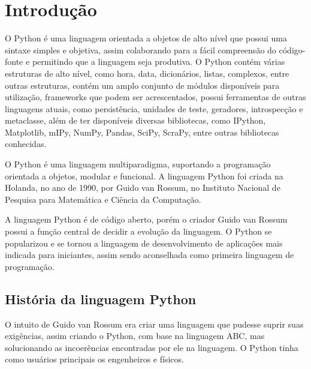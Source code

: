 


\chapter{ Introdução}

O Python é uma linguagem orientada a objetos de alto nível que possui uma sintaxe simples e objetiva, assim colaborando para a fácil compreensão do código-fonte e permitindo que a linguagem seja produtiva. O Python contém várias estruturas de alto nível, como hora, data, dicionários, listas, complexos, entre outras estruturas, contém um amplo conjunto de módulos disponíveis para utilização, frameworks que podem ser acrescentados, possui ferramentas de outras linguagens atuais, como persistência, unidades de teste, geradores, introspecção e metaclasse, além de ter disponíveis diversas bibliotecas, como IPython, Matplotlib, mIPy, NumPy, Pandas, SciPy, ScraPy, entre outras bibliotecas conhecidas.

O Python é uma linguagem multiparadigma, suportando a programação orientada a objetos, modular e funcional. A linguagem Python foi criada na Holanda, no ano de 1990, por Guido van Rossum, no Instituto Nacional de Pesquisa para Matemática e Ciência da Computação. \cite{Borges2014}

A linguagem Python é de código aberto, porém o criador Guido van Rossum possui a função central de decidir a evolução da linguagem. O Python se popularizou e se tornou a linguagem de desenvolvimento de aplicações mais indicada para iniciantes, assim sendo aconselhada como primeira linguagem de programação.\cite{Perkovic2016}




\section{História da linguagem Python}

O intuito de Guido van Rossum era criar uma linguagem que pudesse suprir suas exigências, assim criando o Python, com base na linguagem ABC, mas solucionando as incoerências encontradas por ele na linguagem. O Python tinha como usuários principais os engenheiros e físicos.


